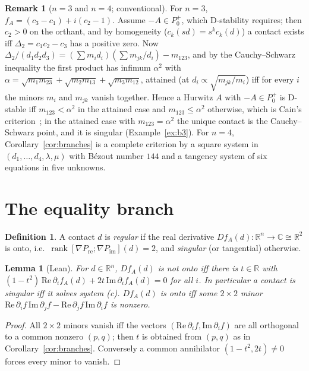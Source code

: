 \documentclass[11pt,a4paper]{article}
\theoremstyle{plain}
\newtheorem{lemma}[theorem]{Lemma}
\theoremstyle{definition}
\newtheorem{definition}[theorem]{Definition}
\newtheorem{remark}[theorem]{Remark}
\newcommand{\R}{\mathbb{R}}
\newcommand{\C}{\mathbb{C}}
\newcommand{\Pre}{P_{\mathrm{re}}}
\newcommand{\Pim}{P_{\mathrm{im}}}
\begin{document}
\begin{remark}[$n=3$ and $n=4$; conventional]\label{rem:smalln}
For $n=3$, $f_A=(c_3-c_1)+i(c_2-1)$. Assume $-A\in P_0^+$, which D-stability requires; then $c_2>0$ on the orthant,
and by homogeneity ($c_k(sd)=s^kc_k(d)$) a contact exists iff $\Delta_2=c_1c_2-c_3$ has a positive zero. Now
$\Delta_2/(d_1d_2d_3)=(\sum m_id_i)(\sum m_{jk}/d_i)-m_{123}$, and by the Cauchy--Schwarz inequality the first
product has infimum $\alpha^2$ with $\alpha=\sqrt{m_1m_{23}}+\sqrt{m_2m_{13}}+\sqrt{m_3m_{12}}$, attained (at
$d_i\propto\sqrt{m_{jk}/m_i}$) iff for every $i$ the minors $m_i$ and $m_{jk}$ vanish together. Hence a Hurwitz
$A$ with $-A\in P_0^+$ is D-stable iff $m_{123}<\alpha^2$ in the attained case and $m_{123}\le\alpha^2$ otherwise, which
is Cain's criterion~\cite{Cain1976}; in the attained case with $m_{123}=\alpha^2$ the unique contact is the
Cauchy--Schwarz point, and it is singular (Example~\ref{ex:b3}). For $n=4$, Corollary~\ref{cor:branches} is a complete
criterion by a square system in $(d_1,\dots,d_4,\lambda,\mu)$ with B\'ezout number $144$ and a tangency system of six
equations in five unknowns.
\end{remark}

\section{The equality branch}\label{sec:equality}

\begin{definition}\label{def:regular}
A contact $d$ is \emph{regular} if the real derivative $Df_A(d)\colon\R^n\to\C\cong\R^2$ is onto, i.e.\
$\operatorname{rank}[\nabla\Pre;\nabla\Pim](d)=2$, and \emph{singular} (or tangential) otherwise.
\end{definition}

\begin{lemma}[Lean]\label{lem:singular}
For $d\in\R^n$, $Df_A(d)$ is not onto iff there is $t\in\R$ with
$(1-t^2)\,\mathrm{Re}\,\partial_if_A(d)+2t\,\mathrm{Im}\,\partial_if_A(d)=0$ for all $i$. In particular a contact is
singular iff it solves system (c). $Df_A(d)$ is onto iff some $2\times2$ minor
$\mathrm{Re}\,\partial_if\,\mathrm{Im}\,\partial_jf-\mathrm{Re}\,\partial_jf\,\mathrm{Im}\,\partial_if$ is nonzero.
\end{lemma}

\begin{proof}
All $2\times2$ minors vanish iff the vectors $(\mathrm{Re}\,\partial_if,\mathrm{Im}\,\partial_if)$ are all orthogonal
to a common nonzero $(p,q)$; then $t$ is obtained from $(p,q)$ as in Corollary~\ref{cor:branches}. Conversely a
common annihilator $(1-t^2,2t)\neq0$ forces every minor to vanish.
\end{proof}
\end{document}
